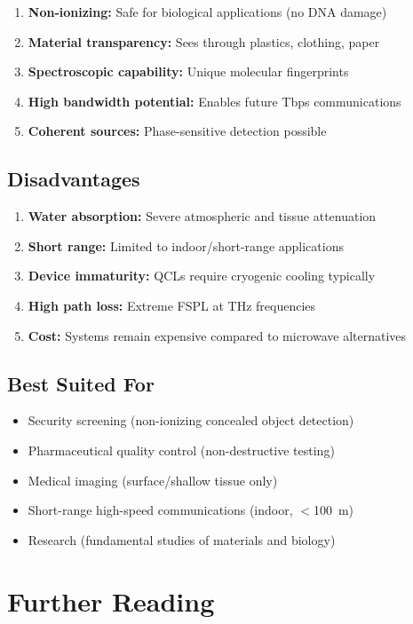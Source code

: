 \begin{enumerate}
\item \textbf{Non-ionizing:} Safe for biological applications (no DNA damage)
\item \textbf{Material transparency:} Sees through plastics, clothing, paper
\item \textbf{Spectroscopic capability:} Unique molecular fingerprints
\item \textbf{High bandwidth potential:} Enables future Tbps communications
\item \textbf{Coherent sources:} Phase-sensitive detection possible
\end{enumerate}

\subsection*{Disadvantages}

\begin{enumerate}
\item \textbf{Water absorption:} Severe atmospheric and tissue attenuation
\item \textbf{Short range:} Limited to indoor/short-range applications
\item \textbf{Device immaturity:} QCLs require cryogenic cooling typically
\item \textbf{High path loss:} Extreme FSPL at THz frequencies
\item \textbf{Cost:} Systems remain expensive compared to microwave alternatives
\end{enumerate}

\subsection*{Best Suited For}

\begin{itemize}
\item Security screening (non-ionizing concealed object detection)
\item Pharmaceutical quality control (non-destructive testing)
\item Medical imaging (surface/shallow tissue only)
\item Short-range high-speed communications (indoor, $<$100~m)
\item Research (fundamental studies of materials and biology)
\end{itemize}

\section{Further Reading}

